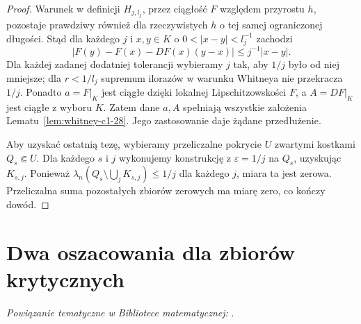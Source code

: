 \begin{proof}
Warunek w definicji $H_{j,l_j}$, przez ciągłość
$F$ względem przyrostu $h$, pozostaje prawdziwy
również dla rzeczywistych $h$ o tej samej
ograniczonej długości. Stąd dla każdego $j$ i
$x,y\in K$ o $0<|x-y|<l_j^{-1}$ zachodzi
\[
 |F(y)-F(x)-DF(x)(y-x)|\le j^{-1}|x-y|.
\]
Dla każdej zadanej dodatniej tolerancji wybieramy $j$
tak, aby $1/j$ było od niej mniejsze; dla $r<1/l_j$
supremum ilorazów w warunku Whitneya nie przekracza
$1/j$. Ponadto $a=F|_K$ jest ciągłe dzięki lokalnej
Lipschitzowskości $F$, a $A=DF|_K$ jest ciągłe
z wyboru $K$. Zatem dane $a,A$ spełniają wszystkie
założenia Lematu~\ref{lem:whitney-c1-28}.
Jego zastosowanie daje żądane przedłużenie.

Aby uzyskać ostatnią tezę, wybieramy przeliczalne
pokrycie $U$ zwartymi kostkami $Q_s\Subset U$.
Dla każdego $s$ i $j$ wykonujemy konstrukcję
z $\varepsilon=1/j$ na $Q_s$, uzyskując
$K_{s,j}$. Ponieważ
$\lambda_n(Q_s\setminus\bigcup_jK_{s,j})\le1/j$
dla każdego $j$, miara ta jest zerowa.
Przeliczalna suma pozostałych zbiorów zerowych
ma miarę zero, co kończy dowód.
\end{proof}

\section{Dwa oszacowania dla zbiorów krytycznych}

\noindent\emph{Powiązanie tematyczne w Bibliotece matematycznej:} .

